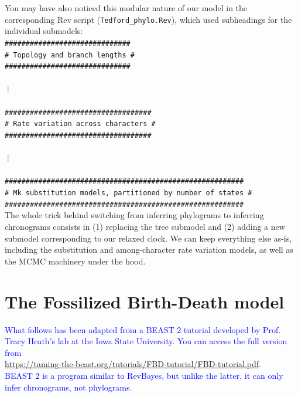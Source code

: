 \documentclass[12pt]{article}
\begin{document}
\newpage

\noindent You may have also noticed this modular nature of our model in the corresponding Rev script (\texttt{Tedford\_phylo.Rev}), which used subheadings for the individual submodels: \\[2ex]

\indent \texttt{\#\#\#\#\#\#\#\#\#\#\#\#\#\#\#\#\#\#\#\#\#\#\#\#\#\#\#\#\#\#} \\
\indent \texttt{\# Topology and branch lengths \#} \\
\indent \texttt{\#\#\#\#\#\#\#\#\#\#\#\#\#\#\#\#\#\#\#\#\#\#\#\#\#\#\#\#\#\#} \\
\ \\
\indent \texttt{\vdots} \\
\ \\
\indent \texttt{\#\#\#\#\#\#\#\#\#\#\#\#\#\#\#\#\#\#\#\#\#\#\#\#\#\#\#\#\#\#\#\#\#\#\#} \\
\indent \texttt{\# Rate variation across characters \#} \\
\indent \texttt{\#\#\#\#\#\#\#\#\#\#\#\#\#\#\#\#\#\#\#\#\#\#\#\#\#\#\#\#\#\#\#\#\#\#\#} \\
\ \\
\indent \texttt{\vdots} \\
\ \\
\indent \texttt{\#\#\#\#\#\#\#\#\#\#\#\#\#\#\#\#\#\#\#\#\#\#\#\#\#\#\#\#\#\#\#\#\#\#\#\#\#\#\#\#\#\#\#\#\#\#\#\#\#\#\#\#\#\#\#\#\#} \\
\indent \texttt{\# Mk substitution models, partitioned by number of states \#} \\
\indent \texttt{\#\#\#\#\#\#\#\#\#\#\#\#\#\#\#\#\#\#\#\#\#\#\#\#\#\#\#\#\#\#\#\#\#\#\#\#\#\#\#\#\#\#\#\#\#\#\#\#\#\#\#\#\#\#\#\#\#} \\[2ex]

\noindent The whole trick behind switching from inferring phylograms to inferring chronograms consists in (1) replacing the tree submodel and (2) adding a new submodel corresponding to our relaxed clock. We can keep everything else as-is, including the substitution and among-character rate variation models, as well as the MCMC machinery under the hood.

\section*{The Fossilized Birth-Death model}

\vspace*{0.5ex}

\begin{center}
\textcolor{blue}{What follows has been adapted from a BEAST 2 tutorial developed by Prof. Tracy Heath's lab at the Iowa State University. You can access the full version from \\
\url{https://taming-the-beast.org/tutorials/FBD-tutorial/FBD-tutorial.pdf}. \\
BEAST 2 is a program similar to RevBayes, but unlike the latter, it can only infer chronograms, not phylograms.}
\end{center}
\end{document}
